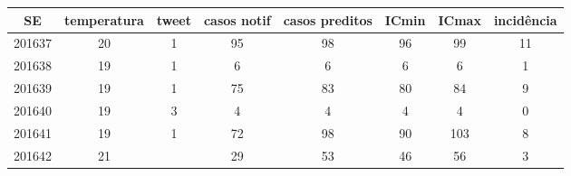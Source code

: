 \begin{tabular}{c|ccccccc}
  \hline
SE & temperatura & tweet & casos notif & casos preditos & ICmin & ICmax & incidência \\ 
  \hline
201637 & 20 & 1 & 95 & 98 & 96 & 99 & 11 \\ 
  201638 & 19 & 1 & 6 & 6 & 6 & 6 & 1 \\ 
  201639 & 19 & 1 & 75 & 83 & 80 & 84 & 9 \\ 
  201640 & 19 & 3 & 4 & 4 & 4 & 4 & 0 \\ 
  201641 & 19 & 1 & 72 & 98 & 90 & 103 & 8 \\ 
  201642 & 21 &  & 29 & 53 & 46 & 56 & 3 \\ 
   \hline
\end{tabular}
